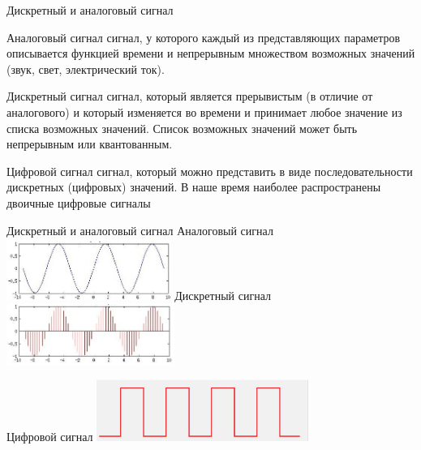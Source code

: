 \begin{frame}{Дискретный и аналоговый сигнал}
\begin{block}{Аналоговый сигнал}
 сигнал, у которого каждый из представляющих параметров описывается функцией времени и непрерывным множеством возможных значений (звук, свет, электрический ток).
\end{block}
\pause
\begin{block}{Дискретный сигнал}
сигнал, который является прерывистым (в отличие от аналогового) и который изменяется во времени и принимает любое значение из списка возможных значений. Список возможных значений может быть непрерывным или квантованным. 
\end{block}
\pause
\begin{block}{Цифровой сигнал}
 сигнал, который можно представить в виде последовательности дискретных (цифровых) значений. В наше время наиболее распространены двоичные цифровые сигналы
\end{block}

\end{frame}

\begin{frame}{Дискретный и аналоговый сигнал}
Аналоговый сигнал
 \includegraphics[height=2cm]{images/analog.png}
\pause
Дискретный сигнал
 \includegraphics[height=2cm]{images/discrete.png}

\pause
Цифровой сигнал
  \includegraphics[height=2cm]{images/digital.png}


\end{frame}

